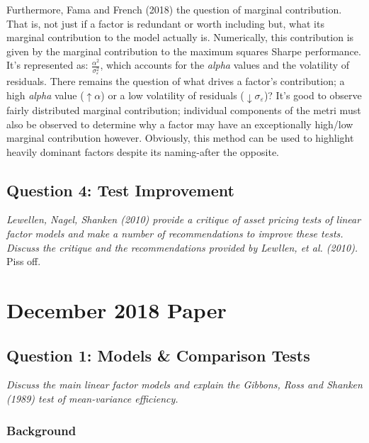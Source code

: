 \documentclass[11pt, english]{article}
\begin{document}
        Furthermore, Fama and French (2018) the question of marginal contribution. That is, not just if a factor is redundant or worth including but, what its marginal contribution to the model actually is. Numerically, this contribution is given by the marginal contribution to the maximum squares Sharpe performance. It's represented as: $\frac{\alpha^2}{\sigma_{\varepsilon}^2}$, which accounts for the \textit{alpha} values and the volatility of residuals. There remains the question of what drives a factor's contribution; a high \textit{alpha} value ($\uparrow\alpha$) or a low volatility of residuals ($\downarrow\sigma_{\varepsilon}$)? It's good to observe fairly distributed marginal contribution; individual components of the metri must also be observed to determine why a factor may have an exceptionally high/low marginal contribution however. Obviously, this method can be used to highlight heavily dominant factors despite its naming-after the opposite.

	\newpage

	\subsection{Question 4: Test Improvement}

	\textit{Lewellen, Nagel, Shanken (2010) provide a critique of asset pricing tests of linear factor models and make a number of recommendations to improve these tests. Discuss the critique and the recommendations provided by Lewllen, et al. (2010).}\\

	Piss off.

\newpage

\section{December 2018 Paper}

	\subsection{Question 1: Models \& Comparison Tests}
        
	\textit{Discuss the main linear factor models and explain the Gibbons, Ross and Shanken (1989) test of mean-variance efficiency.}

		\subsubsection*{Background}
\end{document}
